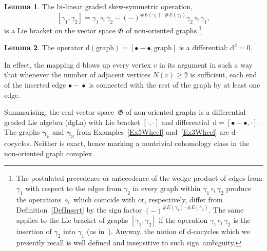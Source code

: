 \documentclass[a4paper]{jpconf}%
\newtheorem{theor}{Theorem}%
\theoremstyle{definition}
\newtheorem{lemma}[theor]{Lemma}%
\theoremstyle{remark}
\newcommand{\Id}{{\mathrm d}}
\begin{document}
\begin{lemma}
The bi\/-\/linear graded skew\/-\/symmetric operation,
\[%
[\gamma_1,\gamma_2] = \gamma_1\circ_i\gamma_2 - (-)^{\# E(\gamma_1)\cdot\# E(\gamma_2)} \gamma_2\circ_i\gamma_1,
\]%
is a Lie bracket on the vector space $\mathfrak{G}$ of non-oriented graphs.\footnote{The postulated precedence or antecedence of the wedge product of edges from $\gamma_1$ with respect to the edges from $\gamma_2$ in every graph within $\gamma_1\circ_i\gamma_2$ produce the operations $\circ_i$ which coincide with or, respectively, differ from Definition~\ref{DefInsert} by the sign factor $(-)^{\# E(\gamma_1)\cdot\# E(\gamma_2)}$. The same applies to the Lie bracket of graphs $[\gamma_1,\gamma_2]$ if the operation $\gamma_1\circ_i\gamma_2$ is %
the insertion of $\gamma_2$ into $\gamma_1$ (as in~\cite{KhoroshkinWillwacherZivkovic}). Anyway, the notion of $\Id$-cocycles which we presently recall is well defined and insensitive to such sign~ambiguity.}
\end{lemma}

\begin{lemma}
The operator $\Id(\text{graph}) = [\bullet\!\!\!-\!\!\!\bullet, \text{graph}]$ is a differential: $\Id^2 = 0$.
\end{lemma}

In effect, the mapping $\Id$ blows up every vertex $v$ in its argument in such a way that whenever the number of adjacent vertices $N(v) \geqslant 2$ is sufficient, each end of the inserted edge $\bullet\!\!\!-\!\!\!\bullet$ is connected with the rest of the graph by at least one edge.

Summarising,
the real vector space~$\mathfrak{G}$ of non\/-\/oriented graphs is a differential graded Lie algebra \textup{(}dgLa\textup{)} with %
Lie bracket $[\cdot,\cdot]$ and differential~$\Id = [\bullet\!\!\!-\!\!\!\bullet, \cdot]$.
The graphs $\boldsymbol{\gamma}_5$ and $\boldsymbol{\gamma}_3$ from Examples~\ref{Ex5Wheel} and~\ref{Ex3Wheel} are $\Id$-\/cocycles.
Neither is exact, hence marking a nontrivial cohomology class in the non-oriented graph complex.
\end{document}
